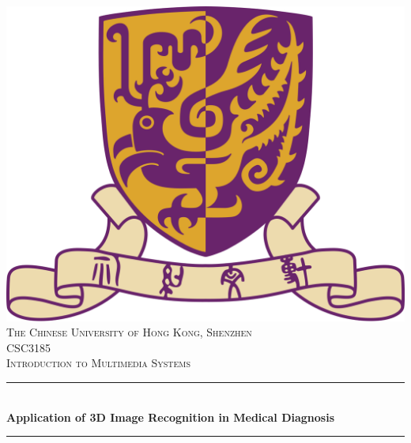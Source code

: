 \documentclass[12pt,a4paper]{report}
\begin{document}
\begin{titlepage}

    \newcommand{\HRule}{\rule{\linewidth}{0.5mm}}

    \center
    \vspace*{1.5cm}


    \includegraphics[scale=.2]{src/cuhk.png}\\[1cm]
    \textsc{\large The Chinese University of Hong Kong, Shenzhen}\\[1.5cm]

    \textsc{\Large CSC3185}\\[0.5cm]

    \textsc{\large Introduction to Multimedia Systems}\\[0.5cm]


    \HRule \\[0.4cm]
    { \bfseries Application of 3D Image Recognition in Medical Diagnosis}
    \HRule \\[1.5cm]



\end{titlepage}
\end{document}
